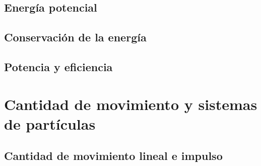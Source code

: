 ﻿\documentclass[11pt,letterpaper,openany]{book}
\newcommand{\rutaraiz}{../..}
\begin{document}




\chapter{Energía potencial}





\chapter{Conservación de la energía}





\chapter{Potencia y eficiencia}





\part{Cantidad de movimiento y sistemas de partículas}



\chapter{Cantidad de movimiento lineal e impulso}
\end{document}
